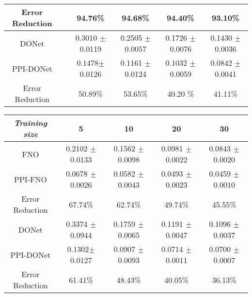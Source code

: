 \begin{table*}[t]
\begin{subtable}{\textwidth}
\begin{tabular}{cccccc}
        Error Reduction          &  & 94.76\%         & 94.68\%        & 
        94.40\%		 & 93.10\%  \\
        \hline
        DONet             &  & 0.3010 $\pm$ 0.0119          & 0.2505 $\pm$ 0.0057      & 0.1726 $\pm$ 0.0076	& 0.1430 $\pm$ 0.0036    \\
        PPI-DONet             &  & 0.1478$\pm$ 0.0126          & 0.1161 $\pm$ 0.0124 	& 0.1032 $\pm$ 0.0059	& 0.0842 $\pm$ 0.0041  \\ 
        Error Reduction &  & 50.89\%         & 53.65\%    	& 40.20
        \%& 41.11\%  \\ \hline
    \end{tabular}
    \caption{\small \textit{Nonlinear diffusion}}
    \end{subtable}
    \begin{subtable}{\textwidth}
    \small
    \centering
        \begin{tabular}{ccccc}
        \hline
        \textit{Training size}        & {5}             & {10}         & {20}     & {30}     \\ \hline
        FNO                    & 0.2102 $\pm$ 0.0133	& 0.1562 $\pm$ 0.0098   & 0.0981 $\pm$ 0.0022   & 0.0843 $\pm$ 0.0020        \\
        PPI-FNO            & 0.0678 $\pm$ 0.0026         & 0.0582 $\pm$ 0.0043        & 0.0493 $\pm$ 0.0023 		 & 0.0459 $\pm$ 0.0010    \\
        Error Reduction & 67.74\%         & 62.74\%        & 49.74\%		 & 45.55\%   \\
        \hline
        DONet               & 0.3374 $\pm$ 0.0944          & 0.1759 $\pm$ 0.0065      & 0.1191 $\pm$ 0.0047 	& 0.1096 $\pm$ 0.0037    \\
        PPI-DONet               & 0.1302$\pm$ 0.0127          & 0.0907 $\pm$ 0.0093 	& 0.0714 $\pm$ 0.0011	& 0.0700 $\pm$ 0.0007  \\ 
        Error Reduction   & 61.41\%         & 48.43\%    	& 40.05\%	& 36.13\%  \\ \hline
    \end{tabular}
    \caption{\small \textit{Eikonal}}
    \end{subtable}


\end{table*}
